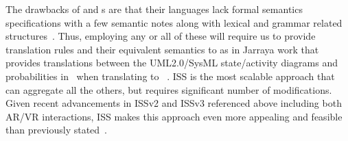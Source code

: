 The drawbacks of {\puredata} and {\graphviz}s  are that their languages lack 
formal semantics specifications with a few semantic notes along with lexical 
and grammar related structures~\cite{dot-language}. Thus, employing any or all of these will 
require us to provide translation rules and their equivalent semantics to 
{\flucid} as in Jarraya work that provides translations between the UML2.0/SysML
state/activity diagrams and probabilities in~\cite{vv-uml-sysml-syseng-designs}
when translating to {\prism}~\cite{flucid-dfg-viz-pst2011}.
%
ISS is the most scalable approach that can aggregate all the others, but 
requires significant number of modifications. Given recent advancements
in ISSv2 and ISSv3 referenced above including both AR/VR interactions,
ISS makes this approach even more appealing and feasible than
previously stated~\cite{flucid-dfg-viz-pst2011}.

